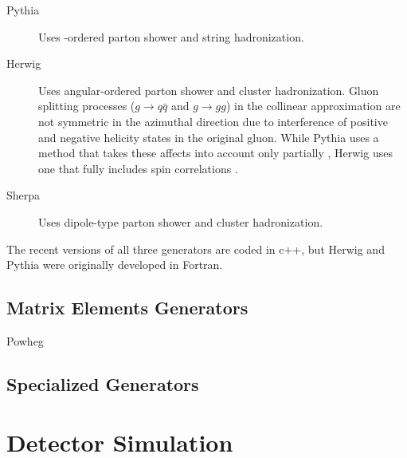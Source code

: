 \begin{description}
\item[Pythia] \cite{Sjostrand:2006za,Sjostrand:2014zea} Uses \pt-ordered parton shower and string hadronization.
\item[Herwig] \cite{Corcella:2000bw,Bahr:2008pv,Bellm:2015jjp} Uses angular-ordered parton shower and cluster hadronization. Gluon splitting processes ($g \rightarrow q\bar{q}$ and $g \rightarrow gg$) in the collinear approximation are not symmetric in the azimuthal direction due to interference of positive and negative helicity states in the original gluon. While Pythia uses a method that takes these affects into account only partially \cite{Webber:1987uy}, Herwig uses one that fully includes spin correlations \cite{Collins:1987cp}. 
\item[Sherpa] \cite{Gleisberg:2008ta} Uses dipole-type parton shower and cluster hadronization. 
\end{description}

The recent versions of all three generators are coded in c++, but Herwig and Pythia were originally developed in Fortran.  

\subsection{Matrix Elements Generators}
\begin{description}
\item[Powheg] 
\end{description}

\subsection{Specialized Generators}


\section{Detector Simulation}

